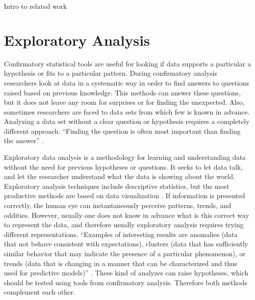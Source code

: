 
Intro to related work




\section{Exploratory Analysis}

%


Confirmatory statistical tools are useful for looking if data supports a particular a hypothesis or fits to a particular pattern.  During confirmatory analysis researchers look at data in a systematic way in order to find answers to questions raised based on previous knowledge. This methods can answer these questions, but it does not leave any room for surprises or for finding the unexpected. Also, sometimes researchers are faced to data sets from which few is known in advance. Analyzing a data set without a clear question or hypothesis requires a completely different approach. ``Finding the question is often most important than finding the answer'' \autocite{tukey_we_1980}.

Exploratory data analysis is a methodology for learning and understanding data without the need for previous hypotheses or questions. It seeks to let data talk, and let the researcher understand what the data is showing about the world. Exploratory analysis techniques include descriptive statistics, but the most productive methods are based on data visualization \autocite{tukey_exploratory_1977}. If information is presented correctly, the human eye can instantaneously perceive patterns, trends, and oddities. However, usually one does not know in advance what is this correct way to represent the data, and therefore usually exploratory analysis requires trying different representations. ``Examples of interesting results are anomalies (data that not behave consistent with expectations), clusters (data that has sufficiently similar behavior that may indicate the presence of a particular phenomenon), or trends (data that is changing in a manner that can be characterized and thus used for predictive models)'' \autocite{ward_interactive_2010}.
These kind of analyzes can raise hypotheses, which should be tested using tools from confirmatory analysis. Therefore both methods complement each other.

